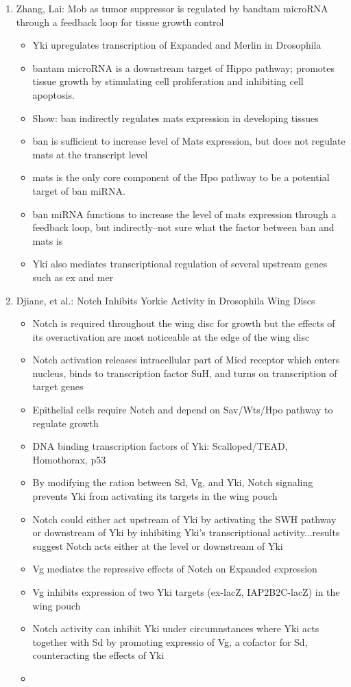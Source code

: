 \documentclass[12pt]{article}
\begin{document}
\begin{enumerate}
\begin{itemize}
\end{itemize}

\item Zhang, Lai: Mob as tumor suppressor is regulated by bandtam microRNA through a feedback loop for tissue growth control
\begin{itemize}
	\item Yki upregulates transcription of Expanded and Merlin in Drosophila
	\item bantam microRNA is a downstream target of Hippo pathway; promotes tissue growth by stimulating cell proliferation and inhibiting cell apoptosis. 
	\item Show: ban indirectly regulates mats expression in developing tissues
	\item ban is sufficient to increase level of Mats expression, but does not regulate mats at the transcript level
	\item mats is the only core component of the Hpo pathway to be a potential target of ban miRNA. 
	\item ban miRNA functions to increase the level of mats expression through a feedback loop, but indirectly--not sure what the factor between ban and mats is
	\item Yki also mediates transcriptional regulation of several upstream genes such as ex and mer
\end{itemize}

\item Djiane, et al.: Notch Inhibits Yorkie Activity in Drosophila Wing Discs
\begin{itemize}
	\item Notch is required throughout the wing disc for growth but the effects of its overactivation are most noticeable at the edge of the wing disc
	\item Notch activation releases intracellular part of Micd receptor which enters nucleus, binds to transcription factor SuH, and turns on transcription of target genes
	\item Epithelial cells require Notch and depend on Sav/Wts/Hpo pathway to regulate growth 
	\item DNA binding transcription factors of Yki: Scalloped/TEAD, Homothorax, p53
	\item By modifying the ration between Sd, Vg, and Yki, Notch signaling prevents Yki from activating its targets in the wing pouch
	\item Notch could either act upstream of Yki by activating the SWH pathway or downstream of Yki by inhibiting Yki's transcriptional activity...results suggest Notch acts either at the level or downstream of Yki
	\item Vg mediates the repressive effects of Notch on Expanded expression
	\item Vg inhibits expression of two Yki targets (ex-lacZ, IAP2B2C-lacZ) in the wing pouch
	\item Notch activity can inhibit Yki under circumnstances where Yki acts together with Sd by promoting expressio of Vg, a cofactor for Sd, counteracting the effects of Yki
	\item 
\end{itemize}
\end{enumerate}
\end{document}

